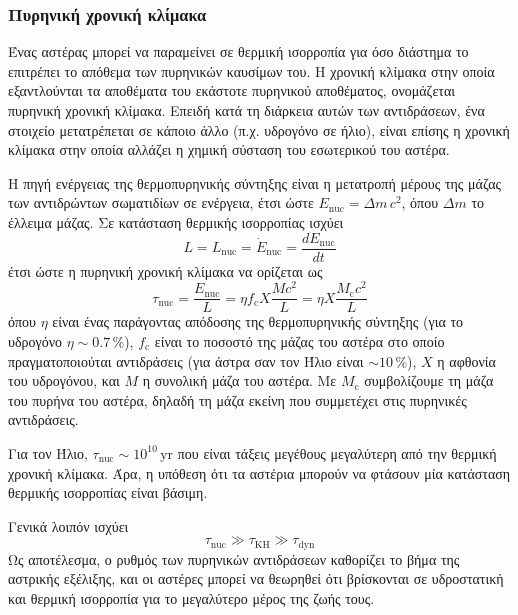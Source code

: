 \subsubsection{Πυρηνική χρονική κλίμακα}
Ένας αστέρας μπορεί να παραμείνει σε θερμική ισορροπία για όσο διάστημα το επιτρέπει το απόθεμα των πυρηνικών καυσίμων του. Η χρονική κλίμακα στην οποία εξαντλούνται τα αποθέματα του εκάστοτε πυρηνικού αποθέματος, ονομάζεται πυρηνική χρονική κλίμακα. Επειδή κατά τη διάρκεια αυτών των αντιδράσεων, ένα στοιχείο μετατρέπεται σε κάποιο άλλο (π.χ. υδρογόνο σε ήλιο), είναι επίσης η χρονική κλίμακα στην οποία αλλάζει η χημική σύσταση του εσωτερικού του αστέρα.

Η πηγή ενέργειας της θερμοπυρηνικής σύντηξης είναι η μετατροπή μέρους της μάζας των αντιδρώντων σωματιδίων σε ενέργεια, έτσι ώστε $E_{\text{nuc}} = \Delta m \,c^2$, όπου $\Delta m$ το έλλειμα μάζας.
Σε κατάσταση θερμικής ισορροπίας ισχύει
$$L = L_{\text{nuc}} = \dot{E}_{\text{nuc}} = \frac{d E_{\text{nuc}}}{dt}$$
έτσι ώστε η πυρηνική χρονική κλίμακα να ορίζεται ως
\begin{equation}
    \label{eq:nuclear_timescale}
    \tau_{\text{nuc}} = \frac{E_{\text{nuc}}}{L} = \eta f_{\text{c}} X \frac{M c^2}{L} = \eta X \frac{M_{\text{c}} c^2}{L}
\end{equation}
όπου $\eta$ είναι ένας παράγοντας απόδοσης της θερμοπυρηνικής σύντηξης (για το υδρογόνο $\eta \sim 0.7 \,\%$), $f_{\text{c}}$ είναι το ποσοστό της μάζας του αστέρα στο οποίο πραγματοποιούται αντιδράσεις (για άστρα σαν τον Ήλιο είναι $\sim 10 \,\%$), $X$ η αφθονία του υδρογόνου, και $M$ η συνολική μάζα του αστέρα. Με $M_{\text{c}}$ συμβολίζουμε τη μάζα του πυρήνα του αστέρα, δηλαδή τη μάζα εκείνη που συμμετέχει στις πυρηνικές αντιδράσεις.

Για τον Ήλιο, $\tau_{\text{nuc}} \sim 10^{10} \,\text{yr}$ που είναι τάξεις μεγέθους μεγαλύτερη από την θερμική χρονική κλίμακα. Άρα, η υπόθεση ότι τα αστέρια μπορούν να φτάσουν μία κατάσταση θερμικής ισορροπίας είναι βάσιμη.

Γενικά λοιπόν ισχύει
\begin{equation}
    \label{eq:stellar_timescales_order}
    \tau_{\text{nuc}} \gg \tau_{\text{KH}} \gg \tau_{\text{dyn}}
\end{equation}
Ως αποτέλεσμα, ο ρυθμός των πυρηνικών αντιδράσεων καθορίζει το βήμα της αστρικής εξέλιξης, και οι αστέρες μπορεί να θεωρηθεί ότι βρίσκονται σε υδροστατική και θερμική ισορροπία για το μεγαλύτερο μέρος της ζωής τους.
